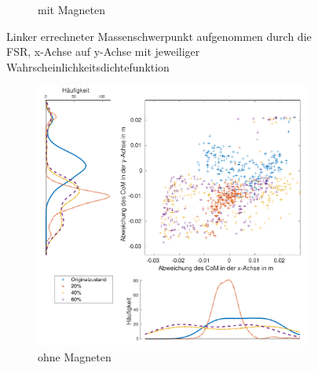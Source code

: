 \begin{figure}[tb]
\begin{adjustwidth}{-0.2\linewidth}{-0.2\linewidth}
\begin{subfigure}[c]{.45\linewidth}
			\caption{mit Magneten}
			\vspace{5pt}
		\end{subfigure}
	\end{adjustwidth}
	\caption{Linker errechneter Massenschwerpunkt aufgenommen durch die FSR, x-Achse auf y-Achse mit jeweiliger Wahrscheinlichkeitsdichtefunktion} \label{CoM_links}
\end{figure}
\begin{figure}[tb]
	\centering
	\begin{adjustwidth}{-0.2\linewidth}{-0.2\linewidth}
		\hspace{40pt}
		\begin{subfigure}[c]{.45\linewidth}
			\centering
			\includegraphics[width=\linewidth]{Bilder/rechts_CoM_ohneM.pdf}
			\caption{ohne Magneten}
			\vspace{5pt}
		\end{subfigure}
		\hspace{-10pt}
		\begin{subfigure}[c]{.45\linewidth}
			\centering

\end{subfigure}
\end{adjustwidth}
\end{figure}
